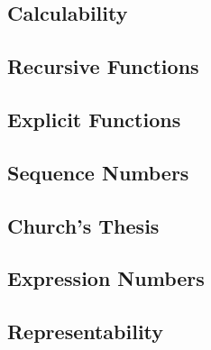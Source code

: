 \subsection{Calculability}


\subsection{Recursive Functions}


\subsection{Explicit Functions}


\subsection{Sequence Numbers}


\subsection{Church's Thesis}


\subsection{Expression Numbers}


\subsection{Representability}

